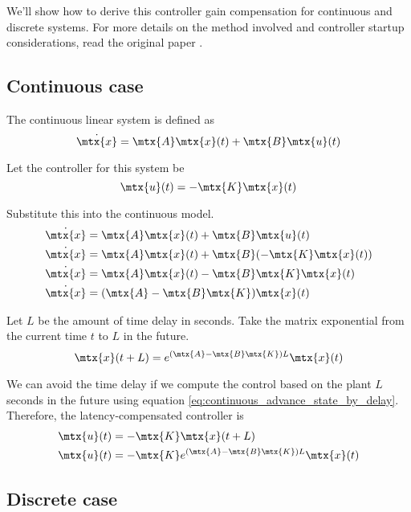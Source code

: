 We'll show how to derive this controller gain compensation for continuous and
discrete systems. For more details on the method involved and controller startup
considerations, read the original paper \cite{bib:lqr_time_delay}.

\subsection{Continuous case}

The continuous linear system is defined as
\begin{equation*}
  \dot{\mtx{x}} = \mtx{A}\mtx{x}(t) + \mtx{B}\mtx{u}(t)
\end{equation*}

Let the controller for this system be
\begin{equation*}
  \mtx{u}(t) = -\mtx{K}\mtx{x}(t)
\end{equation*}

Substitute this into the continuous model.
\begin{align*}
  \dot{\mtx{x}} &= \mtx{A}\mtx{x}(t) + \mtx{B}\mtx{u}(t) \\
  \dot{\mtx{x}} &= \mtx{A}\mtx{x}(t) + \mtx{B}(-\mtx{K}\mtx{x}(t)) \\
  \dot{\mtx{x}} &= \mtx{A}\mtx{x}(t) - \mtx{B}\mtx{K}\mtx{x}(t) \\
  \dot{\mtx{x}} &= (\mtx{A} - \mtx{B}\mtx{K}) \mtx{x}(t)
\end{align*}

Let $L$ be the amount of time delay in seconds. Take the matrix exponential from
the current time $t$ to $L$ in the future.
\begin{equation}
  \mtx{x}(t + L) = e^{(\mtx{A} - \mtx{B}\mtx{K})L} \mtx{x}(t)
    \label{eq:continuous_advance_state_by_delay}
\end{equation}

We can avoid the time delay if we compute the control based on the plant $L$
seconds in the future using equation
\eqref{eq:continuous_advance_state_by_delay}. Therefore, the latency-compensated
controller is
\begin{align}
  \mtx{u}(t) &= -\mtx{K}\mtx{x}(t + L) \nonumber \\
  \mtx{u}(t) &= -\mtx{K} e^{(\mtx{A} - \mtx{B}\mtx{K})L} \mtx{x}(t)
\end{align}

\subsection{Discrete case}

